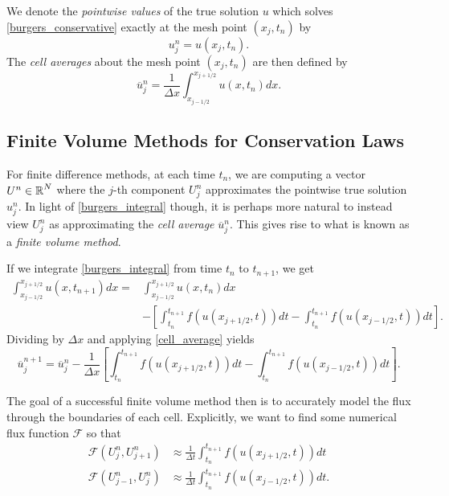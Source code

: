 \documentclass{myproject}
\begin{document}
We denote the \emph{pointwise values} of the true solution $u$ which solves \eqref{burgers_conservative} exactly at the mesh point $(x_j, t_n)$ by 
\begin{equation}
    u_j^n = u(x_j,t_n).
\end{equation}
The \emph{cell averages} about the mesh point $(x_j, t_n)$ are then defined by
\begin{equation}\label{cell_average}
    \overline{u}_j^n = \frac{1}{\Delta x} \int_{x_{j-1/2}}^{x_{j+1/2}} u(x,t_n) dx.
\end{equation}

\subsection{Finite Volume Methods for Conservation Laws}

For finite difference methods, at each time $t_n$, we are computing a vector $U^n \in \operatorname{\mathbb{R}}^N$ where the $j$-th component $U_j^n$ approximates the pointwise true solution $u_j^n$. In light of \eqref{burgers_integral} though, it is perhaps more natural to instead view $U_j^n$ as approximating the \emph{cell average} $\overline{u}_j^n$. This gives rise to what is known as a \emph{finite volume method}.

If we integrate \eqref{burgers_integral} from time $t_n$ to $t_{n+1}$, we get
\begin{align}
    \int_{x_{j-1/2}}^{x_{j+1/2}} u(x,t_{n+1}) dx = &\int_{x_{j-1/2}}^{x_{j+1/2}} u(x,t_{n}) dx \nonumber \\
    &- \left[ \int_{t_n}^{t_{n+1}} f(u(x_{j+1/2},t)) dt - \int_{t_n}^{t_{n+1}} f(u(x_{j-1/2},t)) dt \right].
\end{align}
Dividing by $\Delta x$ and applying \eqref{cell_average} yields
\begin{equation}
    \overline{u}_j^{n+1} = \overline{u}_j^n - \frac{1}{\Delta x}\left[ \int_{t_n}^{t_{n+1}} f(u(x_{j+1/2},t)) dt - \int_{t_n}^{t_{n+1}} f(u(x_{j-1/2},t)) dt \right].
\end{equation}

The goal of a successful finite volume method then is to accurately model the flux through the boundaries of each cell. Explicitly, we want to find some numerical flux function $\mathcal{F}$ so that 
\begin{align}
    \mathcal{F}(U_j^n, U_{j+1}^n) &\approx \frac{1}{\Delta t} \int_{t_n}^{t_{n+1}} f(u(x_{j+1/2}, t)) dt \\
    \mathcal{F}(U_{j-1}^n, U_{j}^n) &\approx \frac{1}{\Delta t} \int_{t_n}^{t_{n+1}} f(u(x_{j-1/2}, t)) dt.
\end{align}
\end{document}
